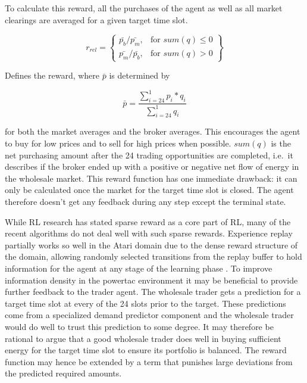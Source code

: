 To calculate this reward, all the purchases of the agent as well as all market clearings are averaged for a given target
time slot.

\begin{equation}
    r_{rel} = \left\{
        \begin{array}{lr}
            \bar{p_b} / \bar{p_m}, & \text{for } sum(q) \leq 0 \\
            \bar{p_m} / \bar{p_b}, & \text{for } sum(q) > 0
    \end{array}\right\}
\end{equation}

Defines the reward, where $\bar{p}$ is determined by

\begin{equation}
    \bar{p} =\frac{\sum ^{1}_{i=24} p_{i} *q_{i}}{\sum ^{1}_{i=24} q_{i}}
\end{equation}

for both the market averages and the broker averages. This encourages the agent to buy for low prices and to sell for high
prices when possible. $sum(q)$ is the net purchasing amount after the 24 trading opportunities are completed, i.e.\ it
describes if 
the broker ended up with a positive or negative net flow of energy in the wholesale market. This reward function has one
immediate drawback: it can only be calculated once the market for the target time slot is closed. The agent therefore
doesn't get any feedback during any step except the terminal state.

While \ac{RL} research has stated sparse reward as a core part of \ac{RL}, many of the recent algorithms do
not deal well with such sparse rewards. Experience replay partially works so well in the Atari domain due to the dense
reward structure of the domain, allowing randomly selected transitions from the replay buffer to hold information for
the agent at any stage of the learning phase \cite[]{schaul2015prioritized}. 
To improve information density in the powertac environment it may be beneficial to provide further feedback to the
trader agent. The wholesale trader gets a prediction for a target time slot at every of the 24 slots prior to the
target. These predictions come from a specialized demand predictor component and the wholesale trader would do well to
trust this prediction to some degree. It may therefore be rational to argue that a good wholesale trader does well in
buying sufficient energy for the target time slot to ensure its portfolio is balanced. The reward function may hence
be extended by a term that punishes large deviations from the predicted required amounts.



